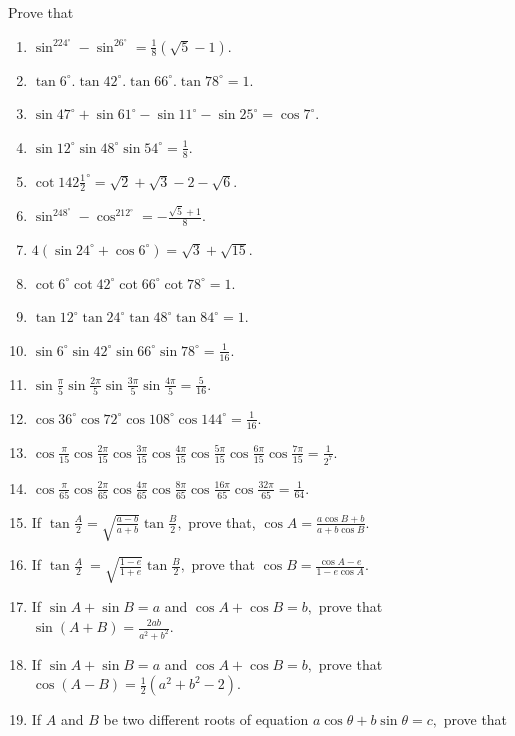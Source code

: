 Prove that

\begin{enumerate}[resume]
\item $\sin^224^\circ - \sin^26^\circ = \frac{1}{8}(\sqrt{5} - 1)$.
\item $\tan6^\circ.\tan42^\circ.\tan66^\circ.\tan78^\circ = 1$.
\item $\sin47^\circ + \sin61^\circ - \sin 11^\circ - \sin25^\circ = \cos 7^\circ$.
\item $\sin 12^\circ\sin48^\circ\sin54^\circ = \frac{1}{8}$.
\item $\cot 142\frac{1}{2}^\circ = \sqrt{2} + \sqrt{3} - 2 - \sqrt{6}$.
\item $\sin^248^\circ - \cos^212^\circ = -\frac{\sqrt{5} + 1}{8}$.
\item $4(\sin 24^\circ + \cos6^\circ) = \sqrt{3} + \sqrt{15}$.
\item $\cot6^\circ\cot42^\circ\cot66^\circ\cot78^\circ = 1$.
\item $\tan12^\circ\tan24^\circ\tan48^\circ\tan84^\circ = 1$.
\item $\sin6^\circ\sin42^\circ\sin66^\circ\sin78^\circ = \frac{1}{16}$.
\item $\sin\frac{\pi}{5}\sin\frac{2\pi}{5}\sin\frac{3\pi}{5}\sin\frac{4\pi}{5} = \frac{5}{16}$.
\item $\cos36^\circ\cos72^\circ\cos108^\circ\cos144^\circ = \frac{1}{16}$.
\item $\cos\frac{\pi}{15}\cos\frac{2\pi}{15}\cos\frac{3\pi}{15}\cos\frac{4\pi}{15}\cos\frac{5\pi}{15}\cos\frac{6\pi}{15}\cos\frac{7\pi}{15}
  = \frac{1}{2^7}$.
\item $\cos\frac{\pi}{65}\cos\frac{2\pi}{65}\cos\frac{4\pi}{65}\cos\frac{8\pi}{65}\cos\frac{16\pi}{65}\cos\frac{32\pi}{65} =
  \frac{1}{64}$.
\item If $\tan \frac{A}{2} = \sqrt{\frac{a - b}{a + b}}\tan \frac{B}{2},$ prove that, $\cos A = \frac{a\cos B + b}{a +
  b\cos B}$.
\item If $\tan \frac{A}{2} \ = \sqrt{\frac{1 - e}{1 + e}}\tan\frac{B}{2},$ prove that $\cos B = \frac{\cos A - e}{1 -
  e\cos A}$.
\item If $\sin A + \sin B = a$ and $\cos A + \cos B = b,$ prove that $\sin(A + B) = \frac{2ab}{a^2 + b^2}$.
\item If $\sin A + \sin B = a$ and $\cos A + \cos B = b,$ prove that $\cos(A - B) = \frac{1}{2}(a^2 + b^2 - 2)$.
\item If $A$ and $B$ be two different roots of equation $a\cos\theta + b\sin\theta = c,$ prove that

\end{enumerate}
